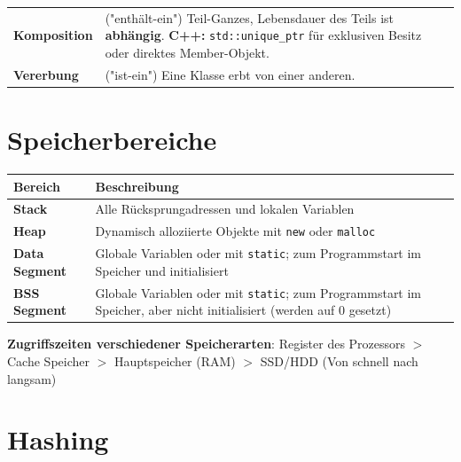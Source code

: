 \documentclass[8pt, landscape]{article}
\begin{document}
\begin{multicols*}{4}
\begin{tabularx}{\linewidth}{l >{\RaggedRight}X}
\textbf{Komposition} & ("enthält-ein") Teil-Ganzes, Lebensdauer des Teils ist \textbf{abhängig}. \newline
\textbf{C++:} \texttt{std::unique\_ptr} für exklusiven Besitz oder direktes Member-Objekt. \\
\textbf{Vererbung} & ("ist-ein") Eine Klasse erbt von einer anderen. \\
\bottomrule
\end{tabularx}

\section{Speicherbereiche}

\noindent
\begin{tabularx}{\linewidth}{l >{\RaggedRight}X}
\toprule
\textbf{Bereich} & \textbf{Beschreibung}  \\
\midrule
\textbf{Stack} & Alle Rücksprungadressen und lokalen Variablen  \\
\textbf{Heap} & Dynamisch alloziierte Objekte mit \lstinline|new| oder \lstinline|malloc|  \\
\textbf{Data Segment} & Globale Variablen oder mit \lstinline|static|; zum Programmstart im
Speicher und initialisiert  \\
\textbf{BSS Segment} & Globale Variablen oder mit \lstinline|static|; zum Programmstart im Speicher, aber nicht initialisiert (werden auf 0 gesetzt)  \\

\bottomrule
\end{tabularx}


\textbf{Zugriffszeiten verschiedener Speicherarten}:  Register des Prozessors $>$ Cache Speicher $>$ Hauptspeicher (RAM) $>$ SSD/HDD (Von schnell nach langsam)


\section{Hashing}


\end{multicols*}
\end{document}

